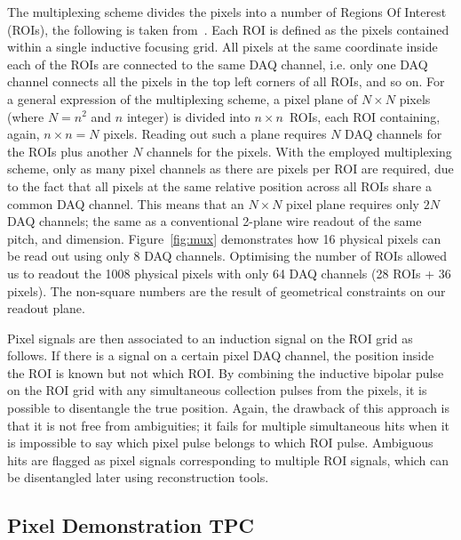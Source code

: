 \documentclass[instruments,article,submit,moreauthors,pdftex]{Definitions/mdpi}
\begin{document}
The multiplexing scheme divides the pixels into a number of Regions Of Interest (ROIs), the following is taken from~\cite{maplesyrup}.
Each ROI is defined as the pixels contained within a single inductive focusing grid.
All pixels at the same coordinate inside each of the ROIs are connected to the same DAQ channel, i.e. only one DAQ channel connects all the pixels in the top left corners of all ROIs, and so on. 
For a general expression of the multiplexing scheme, a pixel plane of $N \times N$ pixels (where $N = n ^ 2$ and $n$ integer) is divided into $n \times n$~ROIs, each ROI containing, again, $n \times n = N$ pixels.
Reading out such a plane requires $N$ DAQ channels for the ROIs plus another $N$ channels for the pixels.
With the employed multiplexing scheme, only as many pixel channels as there are pixels per ROI are required, due to the fact that all pixels at the same relative position across all ROIs share a common DAQ channel.
This means that an $N \times N$ pixel plane requires only $2 N$ DAQ channels; the same as a conventional 2-plane wire readout of the same pitch, and dimension.
Figure~\ref{fig:mux} demonstrates how 16 physical pixels can be read out using only 8 DAQ channels.
Optimising the number of ROIs allowed us to readout the 1008 physical pixels with only 64 DAQ channels (28 ROIs + 36 pixels).
The non-square numbers are the result of geometrical constraints on our readout plane.

Pixel signals are then associated to an induction signal on the ROI grid as follows. 
If there is a signal on a certain pixel DAQ channel, the position inside the ROI is known but not which ROI.
By combining the inductive bipolar pulse on the ROI grid with any simultaneous collection pulses from the pixels, it is possible to disentangle the true position.
Again, the drawback of this approach is that it is not free from ambiguities; it fails for multiple simultaneous hits when it is impossible to say which pixel pulse belongs to which ROI pulse.
Ambiguous hits are flagged as pixel signals corresponding to multiple ROI signals, which can be disentangled later using reconstruction tools. 

\subsection{Pixel Demonstration TPC} \label{sec:viper}
\end{document}

